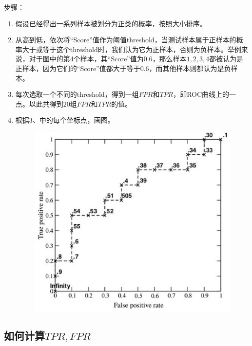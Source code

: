步骤：

\begin{enumerate}\itemsep0em 
		\item 假设已经得出一系列样本被划分为正类的概率，按照大小排序。
		\item 从高到低，依次将``Score''值作为阈值threshold，当测试样本属于正样本的概率大于或等于这个threshold时，我们认为它为正样本，否则为负样本。举例来说，对于图中的第4个样本，其``Score''值为$0.6$，那么样本$1,2,3,4$都被认为是正样本，因为它们的``Score''值都大于等于$0.6$，而其他样本则都认为是负样本。
		\item 每次选取一个不同的threshold，得到一组$FPR$和$TPR$，即ROC曲线上的一点。以此共得到$20$组$FPR$和$TPR$的值。

\item 根据3、中的每个坐标点，画图。

 \begin{figure}[h]
   \centering
   \includegraphics[width=.7\textwidth]{imgs/2.40.11.1.eps}
   \label{fig:2.40.11.1}
 \end{figure}
\end{enumerate}

\subsection{如何计算$TPR,FPR$}

